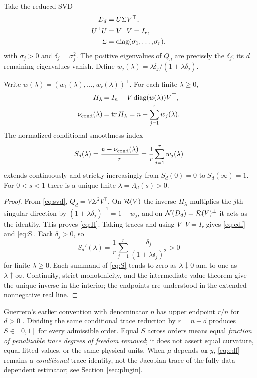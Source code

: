 Take the reduced SVD
\begin{equation}\label{eq:svd}
\begin{aligned}
D_d&=U\Sigma V^\top,\\
U^\top U&=V^\top V=I_r,\\
\Sigma&=\operatorname{diag}(\sigma_1,\ldots,\sigma_r).
\end{aligned}
\end{equation}
with $\sigma_j>0$ and $\delta_j=\sigma_j^2$. The positive eigenvalues of $Q_d$ are precisely the $\delta_j$; its $d$ remaining eigenvalues vanish. Define $w_j(\lambda)=\lambda\delta_j/(1+\lambda\delta_j)$.

\begin{theorem}\label{thm:smoothness}
Write $w(\lambda)=(w_1(\lambda),\ldots,w_r(\lambda))^\top$. For each finite $\lambda\ge0$,
\begin{align}
H_\lambda&=I_n-V\operatorname{diag}(w(\lambda))V^\top,\label{eq:H}\\
\nu_{\rm cond}(\lambda)&=\operatorname{tr} H_\lambda
=n-\sum_{j=1}^r w_j(\lambda).\label{eq:edf}
\end{align}
The normalized conditional smoothness index
\begin{equation}\label{eq:S}
S_d(\lambda)=\frac{n-\nu_{\rm cond}(\lambda)}r
=\frac1r\sum_{j=1}^r w_j(\lambda)
\end{equation}
extends continuously and strictly increasingly from $S_d(0)=0$ to $S_d(\infty)=1$. For $0<s<1$ there is a unique finite $\lambda=\Lambda_d(s)>0$.
\end{theorem}
\begin{proof}
From \eqref{eq:svd}, $Q_d=V\Sigma^2V^\top$. On $\mathcal R(V)$ the inverse $H_\lambda$ multiplies the $j$th singular direction by $(1+\lambda\delta_j)^{-1}=1-w_j$, and on $\mathcal N(D_d)=\mathcal R(V)^\perp$ it acts as the identity. This proves \eqref{eq:H}. Taking traces and using $V^\top V=I_r$ gives \eqref{eq:edf} and \eqref{eq:S}. Each $\delta_j>0$, so
\[
S_d'(\lambda)=\frac1r\sum_{j=1}^r
\frac{\delta_j}{(1+\lambda\delta_j)^2}>0
\]
for finite $\lambda\ge0$. Each summand of \eqref{eq:S} tends to zero as $\lambda\downarrow0$ and to one as $\lambda\uparrow\infty$. Continuity, strict monotonicity, and the intermediate value theorem give the unique inverse in the interior; the endpoints are understood in the extended nonnegative real line.
\end{proof}

\begin{remark}\label{rem:normalization}
Guerrero's earlier convention with denominator $n$ has upper endpoint $r/n$ for $d>0$ \citep{guerrero2008}. Dividing the same conditional trace reduction by $r=n-d$ produces $S\in[0,1]$ for every admissible order. Equal $S$ across orders means equal \emph{fraction of penalizable trace degrees of freedom removed}; it does not assert equal curvature, equal fitted values, or the same physical units. When $\mu$ depends on $y$, \eqref{eq:edf} remains a \emph{conditional} trace identity, not the Jacobian trace of the fully data-dependent estimator; see Section~\ref{sec:plugin}.
\end{remark}
